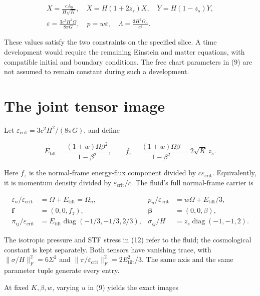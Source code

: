 \documentclass[aps,prd,reprint,onecolumn,nofootinbib]{revtex4-2}
\begin{document}
\[
 \begin{gathered}
 X=\frac{cA_0}{H\sqrt K},\quad
 \dot X=H(1+2z_s)X,\quad \dot Y=H(1-z_s)Y,\\
 \varepsilon=\frac{3c^2H^2\Omega}{8\pi G},\quad
 p=w\varepsilon,\quad \Lambda=\frac{3H^2\Omega_\Lambda}{c^2}.
 \end{gathered}
 \tag{10}
\]

These values satisfy the two constraints on the specified slice. A time development would require the remaining Einstein and matter equations, with compatible initial and boundary conditions. The free chart parameters in (9) are not assumed to remain constant during such a development.

\hypertarget{the-joint-tensor-image}{%
\section{The joint tensor image}\label{the-joint-tensor-image}}

Let \(\varepsilon_{\mathrm{crit}}=3c^2H^2/(8\pi G)\), and define

\[
 E_{\mathrm{tilt}}=\frac{(1+w)\Omega\beta^2}{1-\beta^2},\qquad
 f_z=\frac{(1+w)\Omega\beta}{1-\beta^2}=2\sqrt K\,z_s.
 \tag{11}
\]

Here \(f_z\) is the normal-frame energy-flux component divided by \(c\varepsilon_{\mathrm{crit}}\). Equivalently, it is momentum density divided by \(\varepsilon_{\mathrm{crit}}/c\). The fluid's full normal-frame carrier is

\[
 \begin{aligned}
 \varepsilon_n/\varepsilon_{\mathrm{crit}}&=\Omega+E_{\mathrm{tilt}}=\Omega_n,
 & p_n/\varepsilon_{\mathrm{crit}}&=w\Omega+E_{\mathrm{tilt}}/3,\\
 \boldsymbol f&=(0,0,f_z),
 &\boldsymbol\beta&=(0,0,\beta),\\
 \pi_{ij}/\varepsilon_{\mathrm{crit}}&=
 E_{\mathrm{tilt}}\operatorname{diag}(-1/3,-1/3,2/3),
 &\sigma_{ij}/H&=z_s\operatorname{diag}(-1,-1,2).
 \end{aligned}
 \tag{12}
\]

The isotropic pressure and STF stress in (12) refer to the fluid; the cosmological constant is kept separately. Both tensors have vanishing trace, with \(\|\sigma/H\|_F^2=6\Sigma^2\) and \(\|\pi/\varepsilon_{\mathrm{crit}}\|_F^2=2E_{\mathrm{tilt}}^2/3\). The same axis and the same parameter tuple generate every entry.

At fixed \(K,\beta,w\), varying \(u\) in (9) yields the exact images
\end{document}
